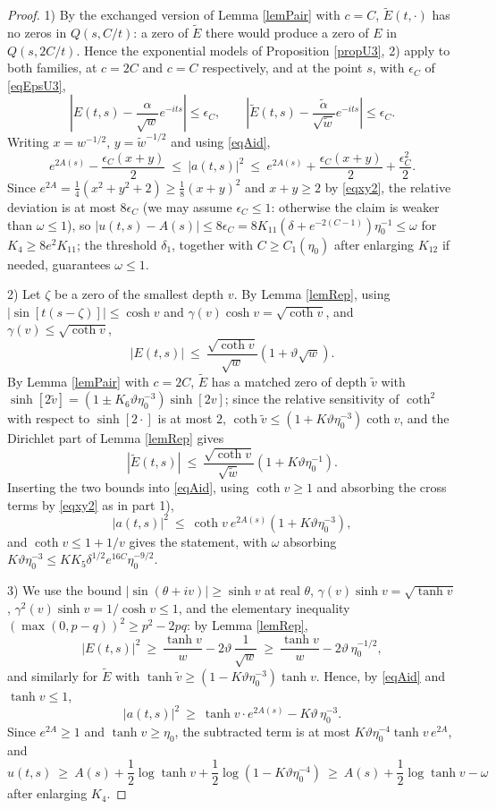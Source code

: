 \documentclass[11pt,twoside,reqno]{amsart}
\def\ti{\tilde}
\def\d{\delta}
\def\g{\gamma}
\def\a{\alpha}
\theoremstyle{plain}
\numberwithin{equation}{section}
\begin{document}
\begin{proof}
1) By the exchanged version of Lemma \ref{lemPair} with $c=C$, $\ti E(t,\cdot)$ has no zeros in $Q(s,C/t)$: a zero of $\ti E$ there would produce a zero of $E$ in $Q(s,2C/t)$. Hence the exponential models of Proposition \ref{propU3}, 2) apply to both families, at $c=2C$ and $c=C$ respectively, and at the point $s$, with $\epsilon_C$ of \eqref{eqEpsU3},
$$\left|E(t,s)-\frac{\a}{\sqrt{w}}e^{-its}\right|\leq\epsilon_C,\qquad
\left|\ti E(t,s)-\frac{\ti\a}{\sqrt{\ti w}}e^{-its}\right|\leq\epsilon_C .$$
Writing $x=w^{-1/2}$, $y=\ti w^{-1/2}$ and using \eqref{eqAid},
$$e^{2A(s)}-\frac{\epsilon_C(x+y)}2\ \leq\ |a(t,s)|^2\ \leq\ e^{2A(s)}+\frac{\epsilon_C(x+y)}2+\frac{\epsilon_C^2}2 .$$
Since $e^{2A}=\frac14(x^2+y^2+2)\geq\frac18(x+y)^2$ and $x+y\geq2$ by \eqref{eqxy2}, the relative deviation is at most $8\epsilon_C$ (we may assume $\epsilon_C\leq1$: otherwise the claim is weaker than $\omega\leq1$), so $|u(t,s)-A(s)|\leq8\epsilon_C=8K_{11}\left(\d+e^{-2(C-1)}\right)\eta_0^{-1}\leq\omega$ for $K_4\geq8e^2K_{11}$; the threshold $\d_1$, together with $C\geq C_1(\eta_0)$ after enlarging $K_{12}$ if needed, guarantees $\omega\leq1$.

2) Let $\zeta$ be a zero of the smallest depth $v$. By Lemma \ref{lemRep}, using $|\sin[t(s-\zeta)]|\leq\cosh v$ and $\g(v)\cosh v=\sqrt{\coth v}$, and $\g(v)\leq\sqrt{\coth v}$,
$$|E(t,s)|\ \leq\ \frac{\sqrt{\coth v}}{\sqrt{w}}\left(1+\vartheta\sqrt w\right).$$
By Lemma \ref{lemPair} with $c=2C$, $\ti E$ has a matched zero of depth $\ti v$ with $\sinh[2\ti v]=(1\pm K_6\vartheta\eta_0^{-3})\sinh[2v]$; since the relative sensitivity of $\coth^2$ with respect to $\sinh[2\cdot]$ is at most $2$, $\coth\ti v\leq(1+K\vartheta\eta_0^{-3})\coth v$, and the Dirichlet part of Lemma \ref{lemRep} gives
$$|\ti E(t,s)|\ \leq\ \frac{\sqrt{\coth v}}{\sqrt{\ti w}}\left(1+K\vartheta\eta_0^{-1}\right).$$
Inserting the two bounds into \eqref{eqAid}, using $\coth v\geq1$ and absorbing the cross terms by \eqref{eqxy2} as in part 1),
$$|a(t,s)|^2\ \leq\ \coth v\ e^{2A(s)}\left(1+K\vartheta\eta_0^{-3}\right),$$
and $\coth v\leq1+1/v$ gives the statement, with $\omega$ absorbing $K\vartheta\eta_0^{-3}\leq K K_5\d^{1/2} e^{16C}\eta_0^{-9/2}$.

3) We use the bound $|\sin(\theta+iv)|\geq\sinh v$ at real $\theta$, $\g(v)\sinh v=\sqrt{\tanh v}$, $\g^2(v)\sinh v=1/\cosh v\leq1$, and the elementary inequality $(\max(0,p-q))^2\geq p^2-2pq$: by Lemma \ref{lemRep},
$$|E(t,s)|^2\ \geq\ \frac{\tanh v}{w}-2\vartheta\,\frac{1}{\sqrt w}\ \geq\ \frac{\tanh v}{w}-2\vartheta\,\eta_0^{-1/2},$$
and similarly for $\ti E$ with $\tanh\ti v\geq(1-K\vartheta\eta_0^{-3})\tanh v$. Hence, by \eqref{eqAid} and $\tanh v\leq1$,
$$|a(t,s)|^2\ \geq\ \tanh v\cdot e^{2A(s)}-K\vartheta\,\eta_0^{-3}.$$
Since $e^{2A}\geq1$ and $\tanh v\geq\eta_0$, the subtracted term is at most $K\vartheta\eta_0^{-4}\tanh v\,e^{2A}$, and
$$u(t,s)\ \geq\ A(s)+\frac12\log\tanh v+\frac12\log\left(1-K\vartheta\eta_0^{-4}\right)\ \geq\ A(s)+\frac12\log\tanh v-\omega$$
after enlarging $K_4$.
\end{proof}
\end{document}
